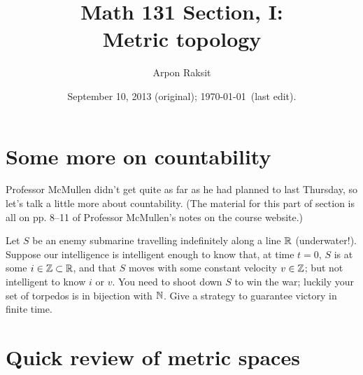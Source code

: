 


\title{Math 131 Section, I:\\Metric topology}
\author{Arpon Raksit}
\date{September 10, 2013 (original); \today\ (last edit).}


\maketitle
\thispagestyle{fancy}


\section{Some more on countability}

Professor McMullen didn't get quite as far as he had planned to last
Thursday, so let's talk a little more about countability. (The
material for this part of section is all on pp. 8--11 of Professor
McMullen's notes on the course website.)

\begin{exercise}
  Let $S$ be an enemy submarine travelling indefinitely along a line
  $\mathbb{R}$ (underwater!). Suppose our intelligence is intelligent enough
  to know that, at time $t=0$, $S$ is at some $i \in \mathbb{Z} \subset \mathbb{R}$,
  and that $S$ moves with some constant velocity $v \in \mathbb{Z}$; but not
  intelligent to know $i$ or $v$. You need to shoot down $S$ to win
  the war; luckily your set of torpedos is in bijection with
  $\mathbb{N}$. Give a strategy to guarantee victory in finite time.
\end{exercise}


\section{Quick review of metric spaces}

